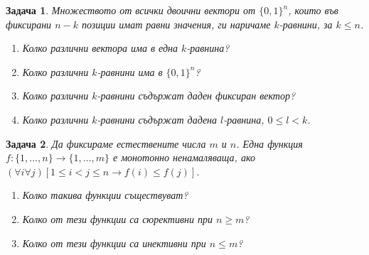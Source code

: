 \documentclass[a4paper]{article}
\newtheorem{problem}{Задача}
\begin{document}
\begin{problem}
  Множеството от всички двоични вектори от $\{0,1\}^{n}$, които във фиксирани $n-k$ позиции имат равни значения,
  ги наричаме $k$-равнини, за $k\leq n$.
  \begin{enumerate}
  \item
    Колко различни вектора има в една $k$-равнина?
  \item
    Колко различни $k$-равнини има в $\{0,1\}^{n}$?
  \item
    Колко различни $k$-равнини съдържат даден фиксиран вектор?
  \item
    Колко различни $k$-равнини съдържат дадена $l$-равнина, $0\leq l < k$.
  \end{enumerate}
\end{problem}


\begin{problem}
  Да фиксираме естествените числа $m$ и $n$.
  Една функция $f:\{1,\dots,n\}\to\{1,\dots,m\}$ е монотонно ненамаляваща, ако
  $(\forall i\forall j)[1\leq i<j\leq n \rightarrow f(i)\leq f(j) ]$.
  \begin{enumerate}
  \item
    Колко такива функции съществуват?
  \item
    Колко от тези функции са сюрективни при $n\geq m$?
  \item
    Колко от тези функции са инективни при $n\leq m$?
\end{enumerate}
\end{problem}
\end{document}
